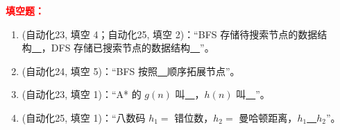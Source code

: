 ﻿\documentclass[../main.tex]{subfiles}
\begin{document}
\noindent\textbf{\textcolor{red}{填空题：}}
\begin{enumerate}[itemsep=0.3em, topsep=0.2em, leftmargin=1.5em]
    \item \textcolor{autoclassgreen}{(自动化23, 填空 4；自动化25, 填空 2)}：``BFS 存储待搜索节点的数据结构\underline{\ \ }，DFS 存储已搜索节点的数据结构\underline{\ \ }''。 
    \item \textcolor{autoclassgreen}{(自动化24, 填空 5)}：``BFS 按照\underline{\ \ }顺序拓展节点''。 
    \item \textcolor{autoclassgreen}{(自动化23, 填空 1)}：``A* 的 $g(n)$ 叫\underline{\ \ }，$h(n)$ 叫\underline{\ \ }''。 
    \item \textcolor{autoclassgreen}{(自动化25, 填空 1)}：``八数码 $h_1=$ 错位数，$h_2=$ 曼哈顿距离，$h_1$\underline{\ \ }$h_2$''。 
\end{enumerate}
\end{document}
